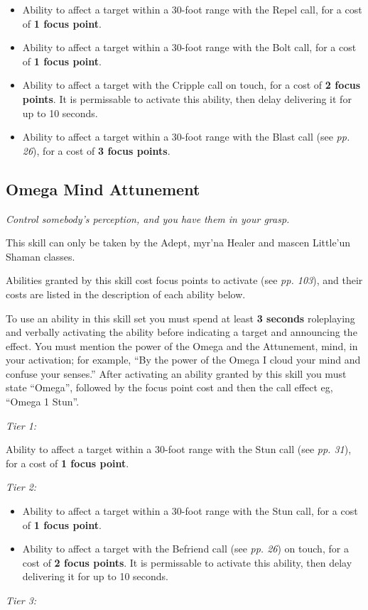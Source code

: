 \documentclass{scrbook}
\begin{document}
\begin{itemize}
\item Ability to affect a target within a 30-foot range with the Repel call, for a cost of \textbf{1 focus point}.

\item Ability to affect a target within a 30-foot range with the Bolt call, for a cost of \textbf{1 focus point}.

\item Ability to affect a target with the Cripple call on touch, for a cost of \textbf{2 focus points}. It is permissable to activate this ability, then delay delivering it for up to 10 seconds.

\item Ability to affect a target within a 30-foot range with the Blast call (see \textit{pp. 26}), for a cost of \textbf{3 focus points}.

\end{itemize}
\subsection{Omega Mind Attunement}

\textit{Control somebody's perception, and you have them in your grasp.}

This skill can only be taken by the Adept, myr'na Healer and mascen Little'un Shaman classes.

Abilities granted by this skill cost focus points to activate (see \textit{pp. 103}), and their costs are listed in the description of each ability below.

To use an ability in this skill set you must spend at least \textbf{3 seconds} roleplaying and verbally activating the ability before indicating a target and announcing the effect. You must mention the power of the Omega and the Attunement, mind, in your activation; for example, ``By the power of the Omega I cloud your mind and confuse your senses.'' After activating an ability granted by this skill you must state ``Omega'', followed by the focus point cost and then the call effect eg, ``Omega 1 Stun''.

\textit{Tier 1:}

Ability to affect a target within a 30-foot range with the Stun call (see \textit{pp. 31}), for a cost of \textbf{1 focus point}.

\textit{Tier 2:}

\begin{itemize}
\item Ability to affect a target within a 30-foot range with the Stun call, for a cost of \textbf{1 focus point}.

\item Ability to affect a target with the Befriend call (see \textit{pp. 26}) on touch, for a cost of \textbf{2 focus points}. It is permissable to activate this ability, then delay delivering it for up to 10 seconds.

\end{itemize}
\textit{Tier 3:}
\end{document}

